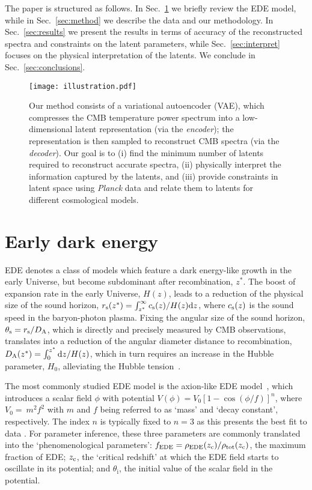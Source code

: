 \documentclass[aps, prd, reprint, superscriptaddress, nofootinbib, bibnotes]{revtex4-2}
\newcommand{\Planck}{\textit{Planck}}
\newcommand{\EDE}{\mathrm{EDE}}
\begin{document}
The paper is structured as follows. In Sec.~\ref{sec:EDE} we briefly review the EDE model, while in Sec.~\ref{sec:method} we describe the data and our methodology. In Sec.~\ref{sec:results} we present the results in terms of accuracy of the reconstructed spectra and constraints on the latent parameters, while Sec.~\ref{sec:interpret} focuses on the physical interpretation of the latents. We conclude in Sec.~\ref{sec:conclusions}.

\begin{figure*}
\centering
\texttt{[image: illustration.pdf]}
\caption{Our method consists of a variational autoencoder (VAE), which compresses the CMB temperature power spectrum into a low-dimensional latent representation (via the \textit{encoder}); the representation is then sampled to reconstruct CMB spectra (via the \textit{decoder}). Our goal is to (i) find the minimum number of latents required to reconstruct accurate spectra, (ii) physically interpret the information captured by the latents, and (iii) provide constraints in latent space using \Planck{} data and relate them to latents for different cosmological models. 
}
\label{fig:illustration}
\end{figure*}

\section{Early dark energy}
\label{sec:EDE}
EDE denotes a class of models which feature a dark energy-like growth in the early Universe, but become subdominant after recombination, $z^*$. The boost of expansion rate in the early Universe, $H(z)$, leads to a reduction of the physical size of the sound horizon, $r_{\rm{s}}(z^*) = \int_{z^*}^\infty c_{\rm{s}}(z)/H(z)\mathrm{d}z$, where $c_{\rm{s}}(z)$ is the sound speed in the baryon-photon plasma. Fixing the angular size of the sound horizon, $\theta_{\rm{s}} = r_{\rm{s}}/D_{\rm{A}}$, which is directly and precisely measured by CMB observations, translates into a reduction of the angular diameter distance to recombination, $D_{\rm{A}}(z^*) = \int_0^{z^*} \mathrm{d}z/H(z)$, which in turn requires an increase in the Hubble parameter, $H_0$, alleviating the Hubble tension~\cite{Kamionkowski:2022pkx, Poulin:2023lkg}. 

The most commonly studied EDE model is the axion-like EDE model~\cite{Karwal:2016vyq, Poulin:2018dzj, Poulin:2018cxd}, which introduces a scalar field $\phi$ with potential $V(\phi) = V_0 [1-\cos(\phi/f)]^n$, where $V_0 =~m^2f^2$ with $m$ and $f$ being referred to as `mass' and `decay constant', respectively. The index $n$ is typically fixed to $n=3$ as this presents the best fit to data \cite{Smith:2019ihp, Poulin:2023lkg}. For parameter inference, these three parameters are commonly translated into the `phenomenological parameters': $f_\EDE = \rho_{\rm EDE}(z_{\rm{c}})/\rho_{\rm tot}(z_{\rm{c}})$, the maximum fraction of EDE; $z_{\rm{c}}$, the `critical redshift' at which the EDE field starts to oscillate in its potential; and $\theta_\mathrm{i}$, the initial value of the scalar field in the potential.
\end{document}
